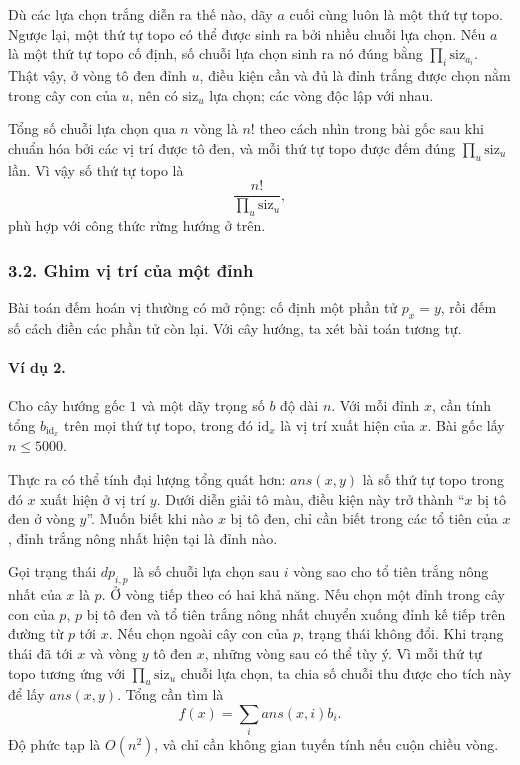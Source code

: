 \documentclass[11pt]{article}
\begin{document}
Dù các lựa chọn trắng diễn ra thế nào, dãy \(a\) cuối cùng luôn là một thứ tự
topo. Ngược lại, một thứ tự topo có thể được sinh ra bởi nhiều chuỗi lựa chọn.
Nếu \(a\) là một thứ tự topo cố định, số chuỗi lựa chọn sinh ra nó đúng bằng
\(\prod_i \mathrm{siz}_{a_i}\). Thật vậy, ở vòng tô đen đỉnh \(u\), điều kiện
cần và đủ là đỉnh trắng được chọn nằm trong cây con của \(u\), nên có
\(\mathrm{siz}_u\) lựa chọn; các vòng độc lập với nhau.

Tổng số chuỗi lựa chọn qua \(n\) vòng là \(n!\) theo cách nhìn trong bài gốc
sau khi chuẩn hóa bởi các vị trí được tô đen, và mỗi thứ tự topo được đếm đúng
\(\prod_u\mathrm{siz}_u\) lần. Vì vậy số thứ tự topo là
\[
  \frac{n!}{\prod_u \mathrm{siz}_u},
\]
phù hợp với công thức rừng hướng ở trên.

\subsubsection*{3.2. Ghim vị trí của một đỉnh}

Bài toán đếm hoán vị thường có mở rộng: cố định một phần tử \(p_x=y\), rồi đếm
số cách điền các phần tử còn lại. Với cây hướng, ta xét bài toán tương tự.

\paragraph{Ví dụ 2.}
Cho cây hướng gốc \(1\) và một dãy trọng số \(b\) độ dài \(n\). Với mỗi đỉnh
\(x\), cần tính tổng \(b_{\mathrm{id}_x}\) trên mọi thứ tự topo, trong đó
\(\mathrm{id}_x\) là vị trí xuất hiện của \(x\). Bài gốc lấy \(n\le 5000\).

Thực ra có thể tính đại lượng tổng quát hơn: \(ans(x,y)\) là số thứ tự topo
trong đó \(x\) xuất hiện ở vị trí \(y\). Dưới diễn giải tô màu, điều kiện này
trở thành ``\(x\) bị tô đen ở vòng \(y\)''. Muốn biết khi nào \(x\) bị tô đen,
chỉ cần biết trong các tổ tiên của \(x\), đỉnh trắng nông nhất hiện tại là đỉnh
nào.

Gọi trạng thái \(dp_{i,p}\) là số chuỗi lựa chọn sau \(i\) vòng sao cho tổ tiên
trắng nông nhất của \(x\) là \(p\). Ở vòng tiếp theo có hai khả năng. Nếu chọn
một đỉnh trong cây con của \(p\), \(p\) bị tô đen và tổ tiên trắng nông nhất
chuyển xuống đỉnh kế tiếp trên đường từ \(p\) tới \(x\). Nếu chọn ngoài cây con
của \(p\), trạng thái không đổi. Khi trạng thái đã tới \(x\) và vòng \(y\) tô
đen \(x\), những vòng sau có thể tùy ý. Vì mỗi thứ tự topo tương ứng với
\(\prod_u\mathrm{siz}_u\) chuỗi lựa chọn, ta chia số chuỗi thu được cho tích này
để lấy \(ans(x,y)\). Tổng cần tìm là
\[
  f(x)=\sum_i ans(x,i)b_i.
\]
Độ phức tạp là \(O(n^2)\), và chỉ cần không gian tuyến tính nếu cuộn chiều vòng.
\end{document}
